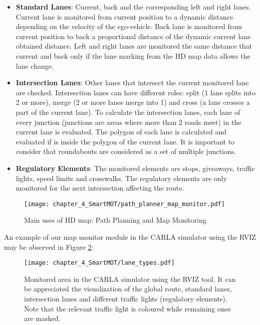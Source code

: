 \begin{itemize}
	
	\item \textbf{Standard Lanes}: Current, back and the corresponding left and right lanes. Current lane is monitored from current position to a dynamic distance depending on the velocity of the ego-vehicle. Back lane is monitored from current position to back a proportional distance of the dynamic current lane obtained distance. Left and right lanes are monitored the same distance that current and back only if the lane marking from the HD map data allows the lane change.
	
	\item \textbf{Intersection Lanes}: Other lanes that intersect the current monitored lane are checked. Intersection lanes can have different roles: split (1 lane splits into 2 or more), merge (2 or more lanes merge into 1) and cross (a lane crosses a part of the current lane). To calculate the intersection lanes, each lane of every junction (junctions are areas where more than 2 roads meet) in the current lane is evaluated. The polygon of each lane is calculated and evaluated if is inside the polygon of the current lane. It is important to consider that roundabouts are considered as a set of multiple junctions. 
	
	\item \textbf{Regulatory Elements}: The monitored elements are stops, giveaways, traffic lights, speed limits and crosswalks. The regulatory elements are only monitored for the next intersection affecting the route. 
	
\end{itemize}

\begin{figure}[] 
	\centering
	\texttt{[image: chapter\_4\_SmartMOT/path\_planner\_map\_monitor.pdf]}
	\caption{Main uses of HD map: Path Planning and Map Monitoring}
	\label{fig:chapter_4_SmartMOT/path_planner_map_monitor}
\end{figure}

An example of our map monitor module in the CARLA simulator \cite{dosovitskiy2017carla} using the \ac{RVIZ} \cite{quigley2009ros} may be observed in Figure \ref{fig:chapter_4_SmartMOT/monitored_area_CARLA_ROS}:

\begin{figure}[h] 
	\centering
	\texttt{[image: chapter\_4\_SmartMOT/lane\_types.pdf]}
	\caption[Monitored area in the CARLA simulator using \ac{RVIZ} tool]{Monitored area in the CARLA simulator using the \ac{RVIZ} tool. It can be appreciated the visualization of the global route, standard lanes, intersection lanes and different traffic lights (regulatory elements). Note that the relevant traffic light is coloured while remaining ones are masked.}
	\label{fig:chapter_4_SmartMOT/monitored_area_CARLA_ROS}
\end{figure}

